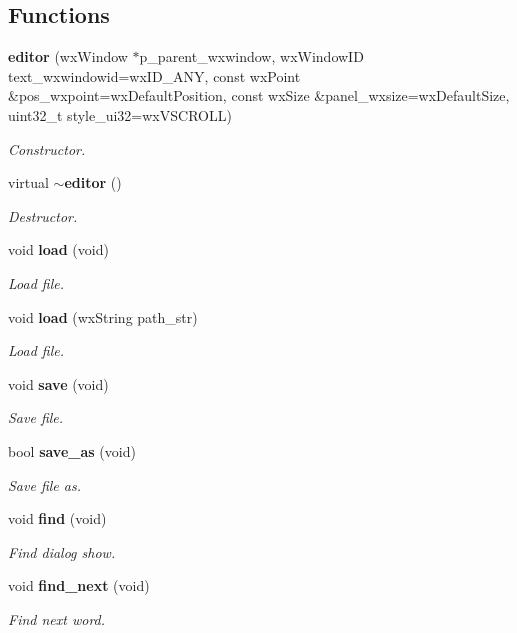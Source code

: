 \subsection*{Functions}
\begin{DoxyCompactItemize}
\item 
\textbf{ editor} (wx\+Window $\ast$p\+\_\+parent\+\_\+wxwindow, wx\+Window\+ID text\+\_\+wxwindowid=wx\+I\+D\+\_\+\+A\+NY, const wx\+Point \&pos\+\_\+wxpoint=wx\+Default\+Position, const wx\+Size \&panel\+\_\+wxsize=wx\+Default\+Size, uint32\+\_\+t style\+\_\+ui32=wx\+V\+S\+C\+R\+O\+LL)
\begin{DoxyCompactList}\small\item\em Constructor. \end{DoxyCompactList}\item 
virtual \textbf{ $\sim$editor} ()
\begin{DoxyCompactList}\small\item\em Destructor. \end{DoxyCompactList}\item 
void \textbf{ load} (void)
\begin{DoxyCompactList}\small\item\em Load file. \end{DoxyCompactList}\item 
void \textbf{ load} (wx\+String path\+\_\+str)
\begin{DoxyCompactList}\small\item\em Load file. \end{DoxyCompactList}\item 
void \textbf{ save} (void)
\begin{DoxyCompactList}\small\item\em Save file. \end{DoxyCompactList}\item 
bool \textbf{ save\+\_\+as} (void)
\begin{DoxyCompactList}\small\item\em Save file as. \end{DoxyCompactList}\item 
void \textbf{ find} (void)
\begin{DoxyCompactList}\small\item\em Find dialog show. \end{DoxyCompactList}\item 
void \textbf{ find\+\_\+next} (void)
\begin{DoxyCompactList}\small\item\em Find next word. \end{DoxyCompactList}\item 

\end{DoxyCompactItemize}
